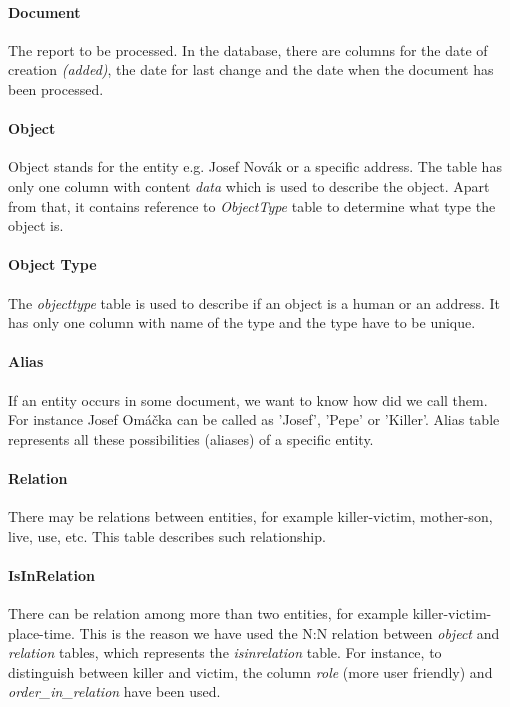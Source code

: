 \paragraph{Document} The report to be processed. In the database, there are columns for the date of 
creation \emph{(added)}, the date for last change and the date when the document has been processed.

\paragraph{Object} Object stands for the entity e.g. Josef Novák or a specific address. 
The table has only one column with content \emph{data} which is used to describe the object. 
Apart from that, it contains reference to \emph{ObjectType} table to determine what type the object is.

\paragraph{Object Type} The \emph{objecttype} table is used to describe if an object is a human or an address. 
It has only one column with name of the type and the type have to be unique.

\paragraph{Alias} If an entity occurs in some document, we want to 
know how did we call them. For instance Josef Omáčka can be called as 'Josef', 
'Pepe' or 'Killer'. Alias table represents all these possibilities (aliases) 
of a specific entity.

\paragraph{Relation} There may be relations between entities, for example killer-victim,
mother-son, live, use, etc. This table describes such relationship. 

\paragraph{IsInRelation} There can be relation among more than two entities, for example 
killer-victim-place-time. This is the reason we have used the N:N relation 
between \emph{object} and \emph{relation} tables, which represents the \emph{isinrelation} 
table. For instance, to distinguish between killer and victim, the column \emph{role} 
(more user friendly) and \emph{order\_{}in\_{}relation} have been used.

